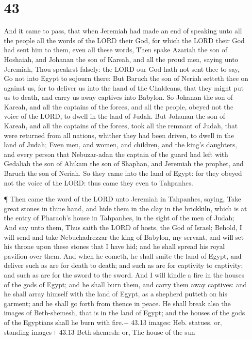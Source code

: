 \hypertarget{section-42}{%
\section{43}\label{section-42}}

 And it came to pass, that when Jeremiah had made an end of
speaking unto all the people all the words of the LORD their God, for
which the LORD their God had sent him to them, even all these words,
 Then spake Azariah the son of Hoshaiah, and Johanan the son
of Kareah, and all the proud men, saying unto Jeremiah, Thou speakest
falsely: the LORD our God hath not sent thee to say, Go not into Egypt
to sojourn there:  But Baruch the son of Neriah setteth thee
on against us, for to deliver us into the hand of the Chaldeans, that
they might put us to death, and carry us away captives into Babylon.
 So Johanan the son of Kareah, and all the captains of the
forces, and all the people, obeyed not the voice of the LORD, to dwell
in the land of Judah.  But Johanan the son of Kareah, and
all the captains of the forces, took all the remnant of Judah, that were
returned from all nations, whither they had been driven, to dwell in the
land of Judah;  Even men, and women, and children, and the
king's daughters, and every person that Nebuzar-adan the captain of the
guard had left with Gedaliah the son of Ahikam the son of Shaphan, and
Jeremiah the prophet, and Baruch the son of Neriah.  So they
came into the land of Egypt: for they obeyed not the voice of the LORD:
thus came they even to Tahpanhes.

 ¶ Then came the word of the LORD unto Jeremiah in
Tahpanhes, saying,  Take great stones in thine hand, and
hide them in the clay in the brickkiln, which is at the entry of
Pharaoh's house in Tahpanhes, in the sight of the men of Judah;
 And say unto them, Thus saith the LORD of hosts, the God
of Israel; Behold, I will send and take Nebuchadrezzar the king of
Babylon, my servant, and will set his throne upon these stones that I
have hid; and he shall spread his royal pavilion over them.
 And when he cometh, he shall smite the land of Egypt, and
deliver such as are for death to death; and such as are for captivity to
captivity; and such as are for the sword to the sword.  And
I will kindle a fire in the houses of the gods of Egypt; and he shall
burn them, and carry them away captives: and he shall array himself with
the land of Egypt, as a shepherd putteth on his garment; and he shall go
forth from thence in peace.  He shall break also the images
of Beth-shemesh, that is in the land of Egypt; and the houses of the
gods of the Egyptians shall he burn with fire.+ 43.13 images: Heb.
statues, or, standing images+ 43.13 Beth-shemesh: or, The house of the
sun

